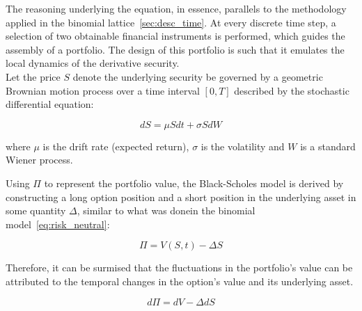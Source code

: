 
    The reasoning underlying the equation, in essence, parallels to the methodology applied in
    the binomial lattice~\ref{sec:desc_time}.
    At every discrete time step, a selection of two obtainable financial instruments is performed,
    which guides the assembly of a portfolio.
    The design of this portfolio is such that it emulates the local dynamics of the derivative security. \\

    Let the price $S$ denote the underlying security be governed by a geometric Brownian motion process
    over a time interval $[0, T]$ described by the stochastic differential equation:

    \begin{equation}
        dS = \mu S dt + \sigma S dW
        \label{eq:geometric_brownian}
    \end{equation}

    where $\mu$ is the drift rate (expected return), $\sigma$ is the volatility and $W$ is a
    standard Wiener process.

    Using $\Pi$ to represent the portfolio value, the Black-Scholes model is derived by constructing a
    long option position and a short position in the underlying asset in some quantity $\Delta$,
    similar to what was donein the binomial model~\ref{eq:risk_neutral}:

    \begin{equation}
        \Pi = V(S,t) - \Delta S
        \label{eq:portfolio_value}
    \end{equation}

    Therefore, it can be surmised that the fluctuations in the portfolio's value can be attributed to the temporal
    changes in the option's value and its underlying asset.

    \begin{equation}
        d\Pi = dV - \Delta dS
        \label{eq:portfolio_fluctuation}
    \end{equation}

